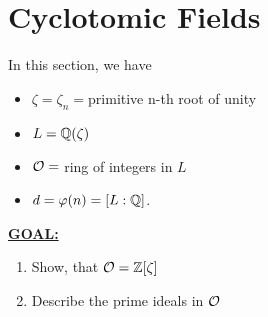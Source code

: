 
\section{Cyclotomic Fields}

In this section, we have

\begin{itemize}
	\item $\zeta = \zeta_n = $primitive n-th root of unity
	\item $L = \mathbb{Q}(\zeta)$
	\item $\mathcal{O} = $ ring of integers in $L$ 
	\item $d = \varphi(n) = \left[ L : \mathbb{Q} \right]$.
\end{itemize}

\underline{\textbf{GOAL:}}
 \begin{enumerate}[(1)]
	\item Show, that $\mathcal{O} = \mathbb{Z}[\zeta]$
	\item Describe the prime ideals in $\mathcal{O}$
\end{enumerate}

